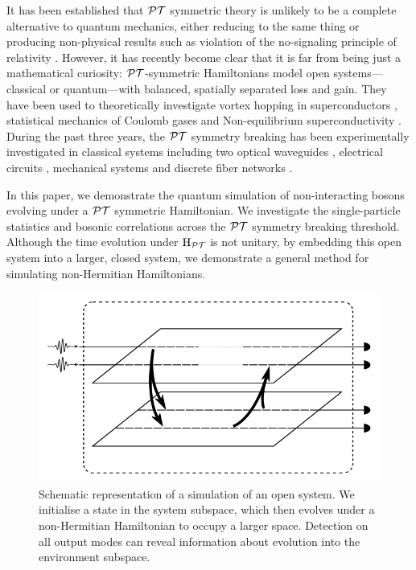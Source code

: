 It has been established that \(\mathcal{PT}\) symmetric theory is unlikely to be a
complete alternative to quantum mechanics, either reducing to the same thing
\cite{mostafazadeh-jmathphys-43-205} or producing non-physical results such as
violation of the no-signaling principle of relativity \cite{lee-prl-112-130404}.
However, it has recently become clear that it is far from being just a
mathematical curiosity: \(\mathcal{PT}\)-symmetric Hamiltonians model open
systems---classical or quantum---with balanced, spatially separated loss and
gain. They have been used to theoretically investigate vortex hopping in
superconductors \cite{naomichi-physrevlett-77-570},
statistical mechanics of Coulomb gases \cite{gulden-jetp-117-517} and
Non-equilibrium superconductivity \cite{rubinstein-physrevlett-99-167003,
serbyn-physrevb-87-020501}. During the past three years, the \(\mathcal{PT}\)
symmetry breaking has been experimentally investigated in classical systems
including two optical waveguides \cite{pt-ruter}, electrical circuits
\cite{schindler-physreva-84-040101}, mechanical systems
\cite{bender-amjphys-81-173} and discrete fiber networks
\cite{pt-regensburger}.

In this paper, we demonstrate the quantum simulation of non-interacting bosons
evolving under a \(\mathcal{PT}\) symmetric
Hamiltonian. We investigate the single-particle statistics and bosonic
correlations across the \(\mathcal{PT}\) symmetry breaking threshold. Although the time
evolution under \(\mathrm{H}_{\mathcal{PT}}\) is not unitary, by embedding this open system
into a larger, closed system, we demonstrate a general method for simulating
non-Hermitian Hamiltonians.

\begin{figure}[t]
  \centering
  \includegraphics{figures/opensystem}
  \caption[Representation of an open system]
  {Schematic representation of a simulation of an open system. We initialise a
  state in the system subspace, which then evolves under a non-Hermitian
  Hamiltonian to occupy a larger space. Detection on all output modes can reveal
  information about evolution into the environment subspace.}
  \label{fig:opensystem}
\end{figure}

